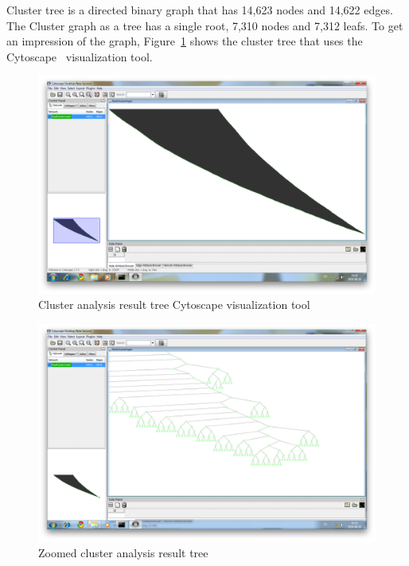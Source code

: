 Cluster tree is a directed binary graph that has 14,623 nodes and 14,622 edges. The Cluster graph as a tree has a single root, 7,310 nodes and 7,312 leafs.
To get an impression of the graph, Figure~\ref{fig:Cytoscape_Cluster_1} shows the cluster tree that uses the Cytoscape~\cite{Cytoscape} visualization tool.

\begin{figure}[h!]
\centering
\includegraphics[scale=0.25]{pictures/Cytoscape_cluster_graph_1.png}
\caption{Cluster analysis result tree Cytoscape visualization tool}
\label{fig:Cytoscape_Cluster_1}
\end{figure}

\begin{figure}[h!]
\centering
\includegraphics[scale=0.25]{pictures/Cytoscape_cluster_graph_2.png}
\caption{Zoomed cluster analysis result tree}
\label{fig:Cytoscape_Cluster_2}
\end{figure}

